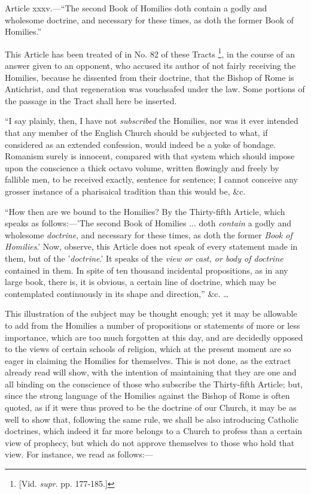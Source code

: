 
Article xxxv.—``The second Book of Homilies doth contain a
godly and wholesome doctrine, and necessary for these times, as doth
the former Book of Homilies.''

This Article has been treated of in No. 82 of these Tracts \footnote{[Vid. \emph{supr}. pp. 177-185.]}, in the course of an answer given to an opponent, who accused
its author of not fairly receiving the Homilies, because he dissented
from their doctrine, that the Bishop of Rome is Antichrist, and that
regeneration was vouchsafed under the law. Some portions of the
passage in the Tract shall here be inserted.

``I say plainly, then, I have not \emph{subscribed} the
Homilies, nor was it ever intended that any member of the English
Church should be subjected to what, if considered as an extended
confession, would indeed be a yoke of bondage. Romanism surely is
innocent, compared with that system which should impose upon the
conscience a thick octavo volume, written flowingly and freely by
fallible men, to be received exactly, sentence for sentence; I cannot
conceive any grosser instance of a pharisaical tradition than this
would be, \&c.

``How then are we bound to the Homilies? By the Thirty-fifth
Article, which speaks as follows:—'The second Book of Homilies ...
doth \emph{contain} a godly and wholesome \emph{doctrine}, and
necessary for these times, as doth the former \emph{Book of Homilies}.'
Now, observe, this Article does not speak of every statement made in
them, but of the '\emph{doctrine}.' It speaks of the \emph{view or cast,
or body of doctrine} contained in them. In spite of ten thousand
incidental propositions, as in any large book, there is, it is obvious, a certain line of doctrine, which may be contemplated
continuously in its shape and direction,'' \&c. …

This illustration of the subject may be thought enough; yet it may
be allowable to add from the Homilies a number of propositions or
statements of more or less importance, which are too much forgotten at
this day, and are decidedly opposed to the views of certain schools of
religion, which at the present moment are so eager in claiming the
Homilies for themselves. This is not done, as the extract already read
will show, with the intention of maintaining that they are one and all
binding on the conscience of those who subscribe the Thirty-fifth
Article; but, since the strong language of the Homilies against the
Bishop of Rome is often quoted, as if it were thus proved to be the
doctrine of our Church, it may be as well to show that, following the
same rule, we shall be also introducing Catholic doctrines, which
indeed it far more belongs to a Church to profess than a certain view
of prophecy, but which do not approve themselves to those who hold
that view. For instance, we read as follows:—

